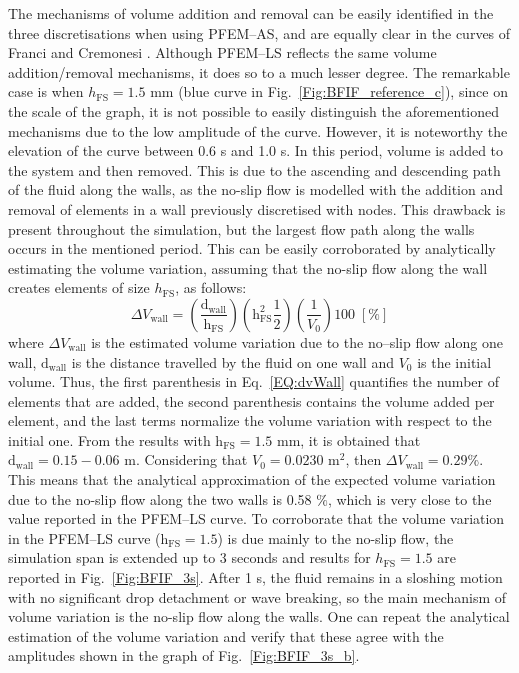 \documentclass[final,3p,times]{elsarticle}
\begin{document}
The mechanisms of volume addition and removal can be easily identified in the three discretisations when using PFEM--AS, and are equally clear in the curves of Franci and Cremonesi \citep{franci2017effect}. Although PFEM--LS reflects the same volume addition/removal mechanisms, it does so to a much lesser degree. The remarkable case is when $h_\mathrm{FS} = 1.5$ mm (blue curve in Fig.~\ref{Fig:BFIF_reference_c}), since on the scale of the graph, it is not possible to easily distinguish the aforementioned mechanisms due to the low amplitude of the curve. However, it is noteworthy the elevation of the curve between 0.6 s and 1.0 s. In this period, volume is added to the system and then removed. This is due to the ascending and descending path of the fluid along the walls, as the no-slip flow is modelled with the addition and removal of elements in a wall previously discretised with nodes. This drawback is present throughout the simulation, but the largest flow path along the walls occurs in the mentioned period. This can be easily corroborated by analytically estimating the volume variation, assuming that the no-slip flow along the wall creates elements of size $h_\mathrm{FS}$, as follows:
%
\begin{equation} \label{EQ:dvWall}
	\Delta V_\mathrm{wall} = \left(  \frac{\mathrm{d}_\mathrm{wall}}{\mathrm{h}_\mathrm{FS}} \right)
	\left(  \mathrm{h}_\mathrm{FS}^2 \frac{1}{2}\right) \left(\frac{1}{V_0} \right) 100 \; [\%]
\end{equation}  
%
\noindent where $\Delta V_\mathrm{wall}$ is the estimated volume variation due to the no--slip flow along one wall, $\mathrm{d}_\mathrm{wall}$ is the distance travelled by the fluid on one wall and $V_0$ is the initial volume. Thus, the first parenthesis in Eq.~\eqref{EQ:dvWall} quantifies the number of elements that are added, the second parenthesis contains the volume added per element, and the last terms normalize the volume variation with respect to the initial one. From the results with $\mathrm{h}_\mathrm{FS} = 1.5$ mm, it is obtained that $\mathrm{d}_\mathrm{wall} = 0.15 - 0.06$ m. Considering that $V_0 = 0.0230$ m$^2$, then $\Delta V_\mathrm{wall} = 0.29 \%$. This means that the analytical approximation of the expected volume variation due to the no-slip flow along the two walls is 0.58 $\%$, which is very close to the value reported in the PFEM--LS curve. To corroborate that the volume variation in the PFEM--LS curve ($\mathrm{h}_\mathrm{FS} = 1.5$) is due mainly to the no-slip flow, the simulation span is extended up to 3 seconds and results for $h_\mathrm{FS}=1.5$ are reported in Fig.~\ref{Fig:BFIF_3s}. After 1 s, the fluid remains in a sloshing motion with no significant drop detachment or wave breaking, so the main mechanism of volume variation is the no-slip flow along the walls. One can repeat the analytical estimation of the volume variation and verify that these agree with the amplitudes shown in the graph of Fig.~\ref{Fig:BFIF_3s_b}. 
\end{document}
